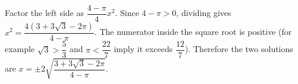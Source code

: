 Factor the left side as $\dfrac{4-\pi}{4} x^2$. Since $4-\pi>0$, dividing gives $x^2=\dfrac{4(3+3\sqrt 3-2\pi)}{4-\pi}$. The numerator inside the square root is positive (for example $\sqrt 3>\dfrac{5}{3}$ and $\pi<\dfrac{22}{7}$ imply it exceeds $\dfrac{12}{7}$). Therefore the two solutions are $\boxed{x=\pm 2\sqrt{\dfrac{3+3\sqrt 3-2\pi}{4-\pi}}}$.
